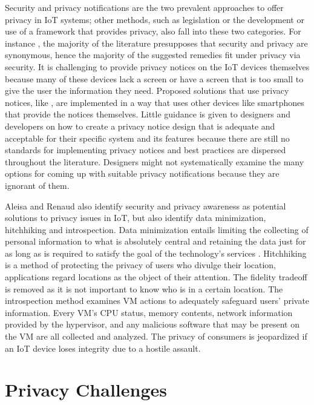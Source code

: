 \documentclass[manuscript,screen,review,natbib=false]{acmart}
\begin{document}
Security and privacy notifications are the two prevalent approaches to
offer privacy in IoT systems; other methods, such as legislation or
the development or use of a framework that provides privacy, also
fall into these two categories. For instance \cite{opara2022framework, FabianoInternet, SunSecure},
the majority of the
literature presupposes that security and privacy are synonymous,
hence the majority of the suggested remedies fit under privacy via
security. It is challenging to provide privacy notices on the IoT
devices themselves because many of these devices lack a screen or
have a screen that is too small to give the user the information
they need. Proposed solutions that use privacy notices, like \cite{FengDesign},
are implemented in a way that uses other devices like smartphones
that provide the notices themselves. Little guidance is given to
designers and developers on how to create a privacy notice design
that is adequate and acceptable for their specific system and
its features because there are still no standards for implementing
privacy notices and best practices are dispersed throughout the
literature. Designers might not systematically examine the
many options for coming up with suitable privacy notifications
because they are ignorant of them.

Aleisa and Renaud \cite{aleisa2016privacy} also identify security and privacy
awareness as potential solutions to privacy issues in IoT, but also identify
data minimization, hitchhiking and introspection. Data minimization entails
limiting the collecting of personal information to what is absolutely central
and retaining the data just for as long as is required to satisfy the goal
of the technology's services \cite{ojDirective281}. Hitchhiking \cite{tang2006putting}
is a method of protecting the privacy of users who divulge their location,
applications regard locations as the object of their attention. The fidelity
tradeoff is removed as it is not important to know who is in a certain
location. The introspection \cite{kang2015protection} method examines VM
actions to adequately safeguard users' private information. Every VM's
CPU status, memory contents, network information provided by the hypervisor,
and any malicious software that may be present on the VM are all collected
and analyzed. The privacy of consumers is jeopardized if an IoT device
loses integrity due to a hostile assault.

\section{Privacy Challenges}
\end{document}
